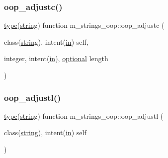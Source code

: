 \mbox{\label{namespacem__strings__oop_a9fa932c23648e737230553a8e7bfb15b}} 
\subsubsection{\texorpdfstring{oop\+\_\+adjustc()}{oop\_adjustc()}}
{\footnotesize\ttfamily \hyperlink{stop__watch_83_8txt_a70f0ead91c32e25323c03265aa302c1c}{type}(\hyperlink{structm__strings__oop_1_1string}{string}) function m\+\_\+strings\+\_\+oop\+::oop\+\_\+adjustc (\begin{DoxyParamCaption}\item[{class(\hyperlink{structm__strings__oop_1_1string}{string}), intent(\hyperlink{M__journal_83_8txt_afce72651d1eed785a2132bee863b2f38}{in})}]{self,  }\item[{integer, intent(\hyperlink{M__journal_83_8txt_afce72651d1eed785a2132bee863b2f38}{in}), \hyperlink{option__stopwatch_83_8txt_aa4ece75e7acf58a4843f70fe18c3ade5}{optional}}]{length }\end{DoxyParamCaption})\hspace{0.3cm}{\ttfamily [private]}}

\mbox{\label{namespacem__strings__oop_a8e2457b4a1c4489e9600e340fa9ce533}} 
\subsubsection{\texorpdfstring{oop\+\_\+adjustl()}{oop\_adjustl()}}
{\footnotesize\ttfamily \hyperlink{stop__watch_83_8txt_a70f0ead91c32e25323c03265aa302c1c}{type}(\hyperlink{structm__strings__oop_1_1string}{string}) function m\+\_\+strings\+\_\+oop\+::oop\+\_\+adjustl (\begin{DoxyParamCaption}\item[{class(\hyperlink{structm__strings__oop_1_1string}{string}), intent(\hyperlink{M__journal_83_8txt_afce72651d1eed785a2132bee863b2f38}{in})}]{self }\end{DoxyParamCaption})\hspace{0.3cm}{\ttfamily [private]}}

